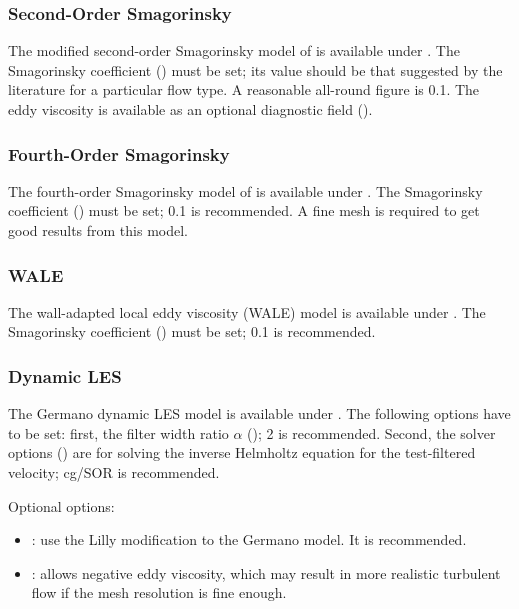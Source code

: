 \subsubsection{Second-Order Smagorinsky}

The modified second-order Smagorinsky model of \citet{bentham2003} is available under . The Smagorinsky coefficient () must be set; its value should be that suggested by the literature for a particular flow type. A reasonable all-round figure is 0.1. The eddy viscosity is available as an optional diagnostic field ().

\subsubsection{Fourth-Order Smagorinsky}

The fourth-order Smagorinsky model of \citet{bentham2003} is available under . The Smagorinsky coefficient () must be set; 0.1 is recommended. A fine mesh is required to get good results from this model.

\subsubsection{WALE}

The wall-adapted local eddy viscosity (WALE) model is available under . The Smagorinsky coefficient () must be set; 0.1 is recommended.

\subsubsection{Dynamic LES}

The Germano dynamic LES model is available under . The following options have to be set: first, the filter width ratio $\alpha$ (); 2 is recommended. Second, the solver options () are for solving the inverse Helmholtz equation for the test-filtered velocity; cg/SOR is recommended.

Optional options:
\begin{itemize}
\item {}: use the Lilly modification to the Germano model. It is recommended.
\item {}: allows negative eddy viscosity, which may result in more realistic turbulent flow if the mesh resolution is fine enough.
\end{itemize}

